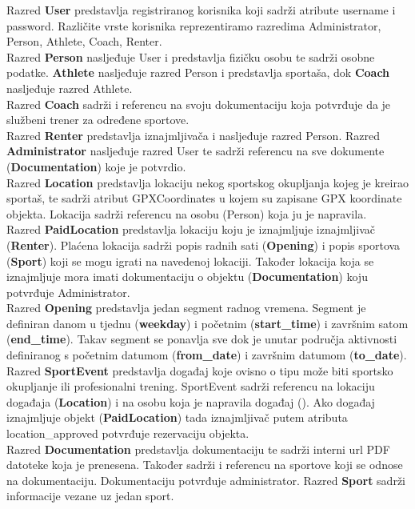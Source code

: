 		Razred \textbf{User} predstavlja registriranog korisnika koji sadrži atribute username i password. Različite vrste korisnika reprezentiramo razredima Administrator, Person, Athlete, Coach, Renter.\\
		Razred \textbf{Person} nasljeđuje User i predstavlja fizičku osobu te sadrži osobne podatke. \textbf{Athlete} nasljeđuje razred Person i predstavlja sportaša, dok \textbf{Coach} nasljeđuje razred Athlete.\\
		Razred \textbf{Coach} sadrži i referencu na svoju dokumentaciju koja potvrđuje da je službeni trener za određene sportove.\\
		Razred \textbf{Renter} predstavlja iznajmljivača i nasljeđuje razred Person. Razred \textbf{Administrator} nasljeđuje razred User te sadrži referencu na sve dokumente (\textbf{Documentation}) koje je potvrdio.\\
		Razred \textbf{Location} predstavlja lokaciju nekog sportskog okupljanja kojeg je kreirao sportaš, te sadrži atribut GPXCoordinates u kojem su zapisane GPX koordinate objekta. Lokacija sadrži referencu na osobu (Person) koja ju je napravila.\\
		Razred \textbf{PaidLocation} predstavlja lokaciju koju je iznajmljuje iznajmljivač (\textbf{Renter}). Plaćena lokacija sadrži popis radnih sati (\textbf{Opening}) i popis sportova (\textbf{Sport}) koji se mogu igrati na navedenoj lokaciji. Također lokacija koja se iznajmljuje mora imati dokumentaciju o objektu (\textbf{Documentation}) koju potvrđuje Administrator.\\
		Razred \textbf{Opening} predstavlja jedan segment radnog vremena. Segment je definiran danom u tjednu (\textbf{weekday}) i početnim (\textbf{start\_time}) i završnim satom (\textbf{end\_time}). Takav segment se ponavlja sve dok je unutar područja aktivnosti definiranog s početnim datumom (\textbf{from\_date}) i završnim datumom (\textbf{to\_date}).\\
		Razred \textbf{SportEvent} predstavlja događaj koje ovisno o tipu može biti sportsko okupljanje ili profesionalni trening. SportEvent sadrži referencu na lokaciju događaja (\textbf{Location}) i na osobu koja je napravila događaj (). Ako događaj iznajmljuje objekt (\textbf{PaidLocation}) tada iznajmljivač putem atributa location\_approved potvrđuje rezervaciju objekta.\\
		Razred \textbf{Documentation} predstavlja dokumentaciju te sadrži interni url PDF datoteke koja je prenesena. Također sadrži i referencu na sportove koji se odnose na dokumentaciju. Dokumentaciju potvrđuje administrator. Razred \textbf{Sport} sadrži informacije vezane uz jedan sport. 
		\eject
		

